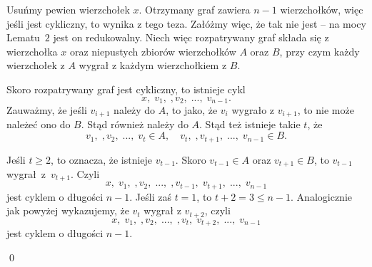 \vspace{5px}


\noindent
Usuńmy pewien wierzchołek $x$. Otrzymany graf zawiera $n - 1$ wierzchołków, więc jeśli jest cykliczny, to wynika z tego teza. Załóżmy więc, że tak nie jest -- na mocy Lematu~$2$ jest on redukowalny. Niech więc rozpatrywany graf składa się z wierzchołka $x$ oraz niepustych zbiorów wierzchołków $A$ oraz $B$, przy czym każdy wierzchołek z $A$ wygrał z każdym wierzchołkiem z $B$.

\vspace{10px}
\noindent
Skoro rozpatrywany graf jest cykliczny, to istnieje cykl
\[
	x, \; v_1, \;, v_2, \; ...,\; v_{n - 1}.
\]
Zauważmy, że jeśli $v_{i + 1}$ należy do $A$, to jako, że $v_{i}$ wygrało z $v_{i + 1}$, to nie może należeć ono do $B$. Stąd również należy do $A$. Stąd też istnieje takie $t$, że
\[
	v_1, \;, v_2, \; ...,\; v_{t} \in A, \quad v_t, \;, v_{t + 1}, \; ...,\; v_{n - 1} \in B.
\]

\begin{center}
\end{center}

\noindent
Jeśli $t \geqslant 2$, to oznacza, że istnieje $v_{t - 1}$. Skoro $v_{t - 1} \in A$ oraz $v_{t + 1} \in B$, to $v_{t - 1}$ wygrał~z~$v_{t + 1}$. Czyli
\[
	x, \; v_1, \;, v_2, \; ..., \;, v_{t - 1}, \; v_{t + 1}, \; ..., \; v_{n - 1}
\]
jest cyklem o długości $n - 1$. Jeśli zaś $t = 1$, to $t + 2 = 3 \leqslant n - 1$. Analogicznie jak powyżej wykazujemy, że $v_{t}$ wygrał z $v_{t + 2}$, czyli
\[
	x, \; v_1, \;, v_2, \; ..., \;, v_{t}, \; v_{t + 2}, \; ..., \; v_{n - 1}
\]
jest cyklem o długości $n - 1$.

\qed
